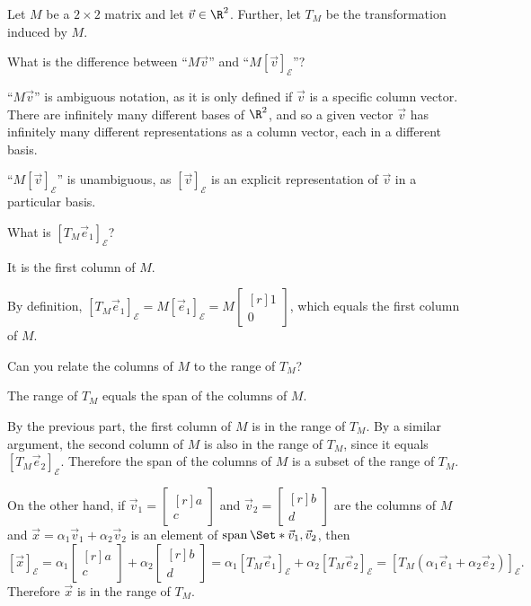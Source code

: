 \documentclass{problemset}
\DeclareMathOperator{\Span}{span}
\newcommand{\xhat}{{\vec e_1}}
\newcommand{\yhat}{{\vec e_2}}
\newcommand{\mat}[1]{\begin{bmatrix*}[r]#1\end{bmatrix*}}
\begin{document}
	\label{inducedTransform}
	Let $M$ be a $2\times 2$ matrix and let $\vec v\in\R^2$. Further, let $T_M$
	be the transformation induced by $M$.
	\begin{parts}
		\item What is the difference between
			``$M\vec v$'' and ``$M[\vec v]_{\mathcal E}$''?
			\begin{solution}
				``$M\vec v$'' is ambiguous notation, as it is only defined if
				$\vec v$ is a specific column vector. There are infinitely many
				different bases of $\R^2$, and so a given vector $\vec v$ has
				infinitely many different representations as a column vector,
				each in a different basis.

				``$M[\vec v]_{\mathcal E}$'' is unambiguous, as
				$[\vec v]_{\mathcal E}$ is an explicit representation of $\vec v$
				in a particular basis.
			\end{solution}
		\item What is $[T_M\xhat]_{\mathcal E}$?
			\begin{solution}
				It is the first column of $M$.

				By definition,
				$[T_M\xhat]_{\mathcal E}=M[\xhat]_{\mathcal E}=M\mat{1\\0}$,
				which equals the first column of $M$.
			\end{solution}
		\item \label{inducedTransform.3}
			Can you relate the columns of $M$ to the range of $T_M$?
			\begin{solution}
				The range of $T_M$ equals the span of the columns of $M$.

				By the previous part, the first column of $M$ is in the range of
				$T_M$. By a similar argument, the second column of $M$ is also
				in the range of $T_M$, since it equals $[T_M\yhat]_{\mathcal E}$.
				Therefore the span of the columns of $M$ is a subset of the range
				of $T_M$.

				On the other hand, if $\vec v_1=\mat{a\\c}$ and $\vec v_2=\mat{b\\d}$
				are the columns of $M$ and $\vec x = \alpha_1\vec v_1+\alpha_2\vec v_2$
				is an element of $\Span\Set*{\vec v_1,\vec v_2}$, then
				\[
					[\vec x]_{\mathcal E}
					=\alpha_1\mat{a\\c}+\alpha_2\mat{b\\d}
					=\alpha_1[T_M\xhat]_{\mathcal E}+\alpha_2[T_M\yhat]_{\mathcal E}
					=[T_M(\alpha_1\xhat+\alpha_2\yhat)]_{\mathcal E}.
				\]
				Therefore $\vec x$ is in the range of $T_M$.
			\end{solution}
	\end{parts}
\end{document}
